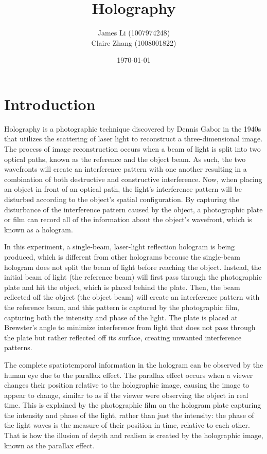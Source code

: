 \documentclass[12pt, letterpaper, twoside]{article}
\title{\textbf{Holography} \vspace{-1em}}
\author{James Li (1007974248) \\
Claire Zhang (1008001822)}\vspace{-2em}
\date{\today}
\begin{document}
\maketitle
\thispagestyle{fancy} %
\section{Introduction}

Holography is a photographic technique discovered by Dennis Gabor in the 1940s that utilizes the scattering of laser light to reconstruct a three-dimensional image. The process of image reconstruction occurs when a beam of light is split into two optical paths, known as the reference and the object beam. As such, the two wavefronts will create an interference pattern with one another resulting in a combination of both destructive and constructive interference. Now, when placing an object in front of an optical path, the light's interference pattern will be disturbed according to the object's spatial configuration. By capturing the disturbance of the interference pattern caused by the object, a photographic plate or film can record all of the information about the object's wavefront, which is known as a hologram.

In this experiment, a single-beam, laser-light reflection hologram is being produced, which is different from other holograms because the single-beam hologram does not split the beam of light before reaching the object. Instead, the initial beam of light (the reference beam) will first pass through the photographic plate and hit the object, which is placed behind the plate. Then, the beam reflected off the object (the object beam) will create an interference pattern with the reference beam, and this pattern is captured by the photographic film, capturing both the intensity and phase of the light. The plate is placed at Brewster's angle to minimize interference from light that does not pass through the plate but rather reflected off its surface, creating unwanted interference patterns.

The complete spatiotemporal information in the hologram can be observed by the human eye due to the parallax effect. The parallax effect occurs when a viewer changes their position relative to the holographic image, causing the image to appear to change, similar to as if the viewer were observing the object in real time. This is explained by the photographic film on the hologram plate capturing the intensity and phase of the light, rather than just the intensity: the phase of the light waves is the measure of their position in time, relative to each other. That is how the illusion of depth and realism is created by the holographic image, known as the parallax effect.
\end{document}
